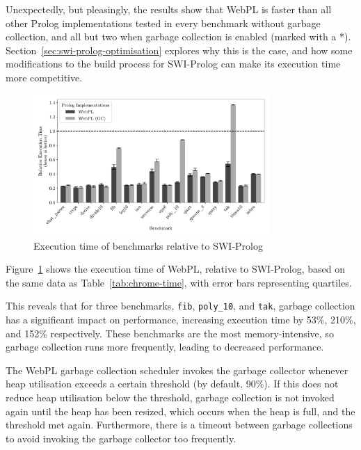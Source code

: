 \vspace*{-1.5em}

Unexpectedly, but pleasingly, the results show that WebPL is faster than all other Prolog implementations tested in every benchmark without garbage collection, and all but two when garbage collection is enabled (marked with a *). Section~\ref{sec:swi-prolog-optimisation} explores why this is the case, and how some modifications to the build process for SWI-Prolog can make its execution time more competitive.

\begin{figure}[H]
\centering
\includegraphics[width=0.8\textwidth]{relative_performance.pdf}
\caption{Execution time of benchmarks relative to SWI-Prolog}
\label{fig:relative-performance}
\end{figure}

Figure~\ref{fig:relative-performance} shows the execution time of WebPL, relative to SWI-Prolog, based on the same data as Table~\ref{tab:chrome-time}, with error bars representing quartiles.

This reveals that for three benchmarks, \texttt{fib}, \texttt{poly\_10}, and \texttt{tak}, garbage collection has a significant impact on performance, increasing execution time by 53\%, 210\%, and 152\% respectively. These benchmarks are the most memory-intensive, so garbage collection runs more frequently, leading to decreased performance.

The WebPL garbage collection scheduler invokes the garbage collector whenever heap utilisation exceeds a certain threshold (by default, 90\%). If this does not reduce heap utilisation below the threshold, garbage collection is not invoked again until the heap has been resized, which occurs when the heap is full, and the threshold met again. Furthermore, there is a timeout between garbage collections to avoid invoking the garbage collector too frequently.

